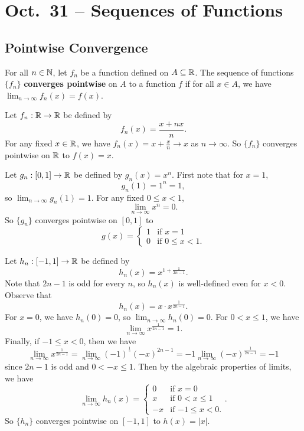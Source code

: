 \chapter{Oct.~31 -- Sequences of Functions}

\section{Pointwise Convergence}
\begin{definition}
  For all $n \in \mathbb{N}$, let $f_n$ be a function defined
  on $A \subseteq \mathbb{R}$. The sequence of functions $\{f_n\}$
  \textbf{converges pointwise} on $A$ to a function $f$ if
  for all $x \in A$, we have
  $\lim_{n \to \infty} f_n(x) = f(x)$.
\end{definition}

\begin{example}
  Let $f_n : \mathbb{R} \to \mathbb{R}$ be defined by
  \[f_n(x) = \frac{x + nx}{n}.\]
  For any fixed $x \in \mathbb{R}$, we have
  $f_n(x) = x + \frac{x}{n} \to x$ as $n \to \infty$.
  So $\{f_n\}$ converges pointwise on $\mathbb{R}$ to $f(x) = x$.
\end{example}

\begin{example}
  Let $g_n : [0, 1] \to \mathbb{R}$ be defined by $g_n(x) = x^n$.
  First note that for $x = 1$,
  \[g_n(1) = 1^n = 1,\]
  so $\lim_{n \to \infty} g_n(1) = 1$. For any
  fixed $0 \le x < 1$,
  \[\lim_{n \to \infty} x^n = 0.\]
  So $\{g_n\}$ converges pointwise on $[0, 1]$ to
  \[g(x) = \begin{cases}
    1 & \text{if }x = 1 \\
    0 & \text{if } 0 \le x < 1.
  \end{cases}\]
\end{example}

\begin{example}
  Let $h_n : [-1, 1] \to \mathbb{R}$ be defined by
  \[
    h_n(x) = x^{1 + \frac{1}{2n - 1}}
  .\]
  Note that $2n - 1$ is odd for every $n$, so $h_n(x)$
  is well-defined even for $x < 0$. Observe that
  \[h_n(x) = x \cdot x^{\frac{1}{2n - 1}}.\]
  For $x = 0$, we have $h_n(0) = 0$, so
  $\lim_{n \to \infty} h_n(0) = 0$. For $0 < x \le 1$,
  we have
  \[\lim_{n \to \infty} x^{\frac{1}{2n - 1}} = 1.\]
  Finally, if $-1 \le x < 0$, then we have
  \[\lim_{n \to \infty} x^{\frac{1}{2n - 1}} = \lim_{n \to \infty} (-1)^{\frac{1}{}}(-x)^{2n - 1} = -1 \lim_{n \to \infty} (-x)^{\frac{1}{2n - 1}} = -1\]
  since $2n - 1$ is odd and $0 < -x \le 1$. Then by the
  algebraic properties of limits, we have
  \[
    \lim_{n \to \infty} h_n(x) = \begin{cases}
      0 & \text{if } x = 0 \\
      x & \text{if } 0 < x \le 1 \\
      -x & \text{if } {-1 \le x < 0}.
    \end{cases}.
  \]
  So $\{h_n\}$ converges pointwise on $[-1, 1]$ to
  $h(x) = |x|$.
\end{example}

